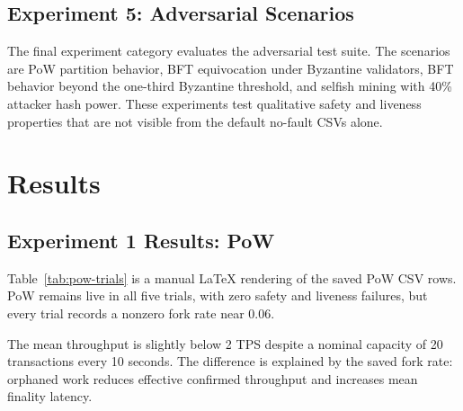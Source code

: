 \documentclass[11pt]{article}
\begin{document}
\subsection{Experiment 5: Adversarial Scenarios}

The final experiment category evaluates the adversarial test suite. The scenarios are PoW partition behavior, BFT equivocation under Byzantine validators, BFT behavior beyond the one-third Byzantine threshold, and selfish mining with 40\% attacker hash power. These experiments test qualitative safety and liveness properties that are not visible from the default no-fault CSVs alone.

\section{Results}

\subsection{Experiment 1 Results: PoW}

Table~\ref{tab:pow-trials} is a manual LaTeX rendering of the saved PoW CSV rows. PoW remains live in all five trials, with zero safety and liveness failures, but every trial records a nonzero fork rate near 0.06.

\begin{table}[t]
\centering
\caption{PoW trial-level results read from the saved Phase 12 CSV.}
\label{tab:pow-trials}
\end{table}

The mean throughput is slightly below 2 TPS despite a nominal capacity of 20 transactions every 10 seconds. The difference is explained by the saved fork rate: orphaned work reduces effective confirmed throughput and increases mean finality latency.
\end{document}
